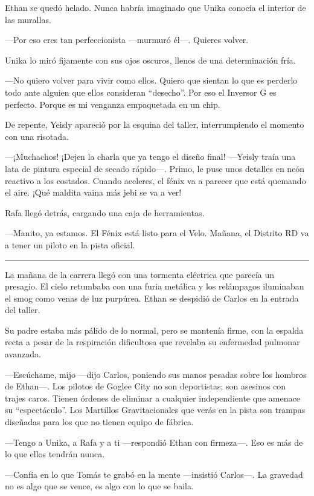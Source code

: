 \documentclass[12pt,a4paper]{book}
\begin{document}
Ethan se quedó helado. Nunca habría imaginado que Unika conocía el interior de las murallas.

---Por eso eres tan perfeccionista ---murmuró él---. Quieres volver.

Unika lo miró fijamente con sus ojos oscuros, llenos de una determinación fría.

---No quiero volver para vivir como ellos. Quiero que sientan lo que es perderlo todo ante alguien que ellos consideran ``desecho''. Por eso el Inversor G es perfecto. Porque es mi venganza empaquetada en un chip.

De repente, Yeisly apareció por la esquina del taller, interrumpiendo el momento con una risotada.

---¡Muchachos! ¡Dejen la charla que ya tengo el diseño final! ---Yeisly traía una lata de pintura especial de secado rápido---. Primo, le puse unos detalles en neón reactivo a los costados. Cuando aceleres, el fénix va a parecer que está quemando el aire. ¡Qué maldita vaina más jebi se va a ver!

Rafa llegó detrás, cargando una caja de herramientas.

---Manito, ya estamos. El Fénix está listo para el Velo. Mañana, el Distrito RD va a tener un piloto en la pista oficial.

\bigskip
\noindent\rule{\textwidth}{0.4pt}
\bigskip

La mañana de la carrera llegó con una tormenta eléctrica que parecía un presagio. El cielo retumbaba con una furia metálica y los relámpagos iluminaban el smog como venas de luz purpúrea. Ethan se despidió de Carlos en la entrada del taller. 

Su padre estaba más pálido de lo normal, pero se mantenía firme, con la espalda recta a pesar de la respiración dificultosa que revelaba su enfermedad pulmonar avanzada.

---Escúchame, mijo ---dijo Carlos, poniendo sus manos pesadas sobre los hombros de Ethan---. Los pilotos de Goglee City no son deportistas; son asesinos con trajes caros. Tienen órdenes de eliminar a cualquier independiente que amenace su ``espectáculo''. Los Martillos Gravitacionales que verás en la pista son trampas diseñadas para los que no tienen equipo de fábrica.

---Tengo a Unika, a Rafa y a ti ---respondió Ethan con firmeza---. Eso es más de lo que ellos tendrán nunca.

---Confía en lo que Tomás te grabó en la mente ---insistió Carlos---. La gravedad no es algo que se vence, es algo con lo que se baila.
\end{document}
